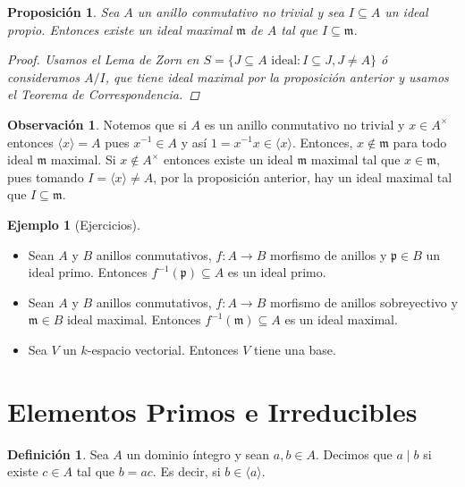\documentclass[12pt]{book}
\newtheorem{prop}[teo]{Proposición}
\theoremstyle{definition}
\newtheorem{obs}[teo]{Observación}
\newtheorem{defn}[teo]{Definición}
\newtheorem{ex}[teo]{Ejemplo}
\begin{document}
\begin{prop}
Sea $A$ un anillo conmutativo no trivial y sea $I\subseteq A$ un ideal propio. Entonces existe un ideal maximal $\mathfrak{m}$ de $A$ tal que $I\subseteq \mathfrak{m}$.
\begin{proof}
Usamos el Lema de Zorn en $S=\{J\subseteq A\text{ ideal}:I\subseteq J, J\neq A\}$ ó consideramos $A/I$, que tiene ideal maximal por la proposición anterior y usamos el Teorema de Correspondencia.
\end{proof}
\end{prop}

\begin{obs}
Notemos que si $A$ es un anillo conmutativo no trivial y $x\in A^\times$ entonces $\langle x\rangle = A$ pues $x^{-1}\in A$ y así $1=x^{-1}x\in \langle x\rangle$. Entonces, $x\notin \mathfrak{m}$ para todo ideal $\mathfrak{m}$ maximal. Si $x\notin A^\times$ entonces existe un ideal $\mathfrak{m}$ maximal tal que $x\in \mathfrak{m}$, pues tomando $I=\langle x\rangle \neq A$, por la proposición anterior, hay un ideal maximal tal que $I\subseteq \mathfrak{m}$.
\end{obs}

\begin{ex}[Ejercicios]
\begin{itemize}
\item Sean $A$ y $B$ anillos conmutativos, $f:A\to B$ morfismo de anillos y $\mathfrak{p}\in B$ un ideal primo. Entonces $f^{-1}(\mathfrak{p})\subseteq A$ es un ideal primo.
\item Sean $A$ y $B$ anillos conmutativos, $f:A\to B$ morfismo de anillos sobreyectivo y $\mathfrak{m}\in B$ ideal maximal. Entonces $f^{-1}(\mathfrak{m})\subseteq A$ es un ideal maximal.
\item Sea $V$ un $k$-espacio vectorial. Entonces $V$ tiene una base. 
\end{itemize}
\end{ex}

\section{Elementos Primos e Irreducibles}

\begin{defn}
Sea $A$ un dominio íntegro y sean $a,b\in A$. Decimos que $a\mid b$ si existe $c\in A$ tal que $b=ac$. Es decir, si $b\in\langle a\rangle$.
\end{defn}
\end{document}
